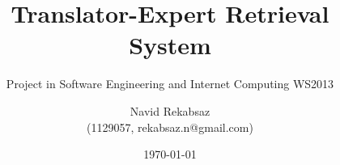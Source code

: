 \title{Translator-Expert Retrieval System}
\subtitle{Project in Software Engineering and Internet Computing WS2013 \\[0.8cm] {\rmfamily\normalfont\Large}}

\author{
    Navid Rekabsaz \\ {\small (1129057, rekabsaz.n@gmail.com)}
}

\date{\today}
